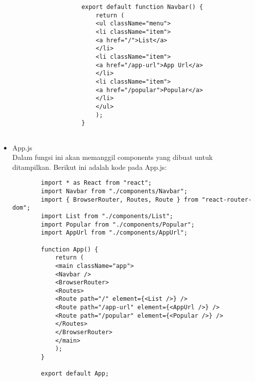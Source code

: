 \begin{itemize}
\begin{itemize}
\begin{lstlisting}
				export default function Navbar() {
					return (
					<ul className="menu">
					<li className="item">
					<a href="/">List</a>
					</li>
					<li className="item">
					<a href="/app-url">App Url</a>
					</li>
					<li className="item">
					<a href="/popular">Popular</a>
					</li>
					</ul>
					);
				}
				
			\end{lstlisting}
		
	\end{itemize}
	
	\item App.js\\
	Dalam fungsi ini akan memanggil components yang dibuat untuk ditampilkan. Berikut ini adalah kode pada App.js:
	\begin{lstlisting}
		import * as React from "react";
		import Navbar from "./components/Navbar";
		import { BrowserRouter, Routes, Route } from "react-router-dom";
		import List from "./components/List";
		import Popular from "./components/Popular";
		import AppUrl from "./components/AppUrl";
		
		function App() {
			return (
			<main className="app">
			<Navbar />
			<BrowserRouter>
			<Routes>
			<Route path="/" element={<List />} />
			<Route path="/app-url" element={<AppUrl />} />
			<Route path="/popular" element={<Popular />} />
			</Routes>
			</BrowserRouter>
			</main>
			);
		}
		
		export default App;
	\end{lstlisting}
\end{itemize}

